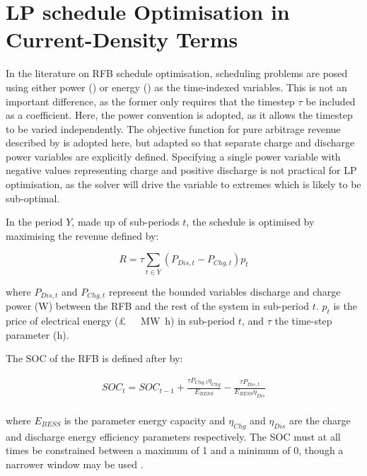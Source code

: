 \documentclass[preprint,3p,review,authoryear,10pt]{elsarticle}
\begin{document}
\section{LP schedule Optimisation in Current-Density Terms}
\label{Model_Formulation_LP_Reference_Current_Density_Terms}
In the literature on RFB schedule optimisation, scheduling problems are posed using either power (\cite{Chen2012,Hu2010,Nguyen2015}) or energy (\cite{Johnston2015,Vaca2017}) as the time-indexed variables. This is not an important difference, as the former only requires that the timestep $\tau$ be included as a coefficient. Here, the power convention is adopted, as it allows the timestep to be varied independently. The objective function for pure arbitrage revenue described by \cite{Hu2010} is adopted here, but adapted so that separate charge and discharge power variables are explicitly defined. Specifying a single power variable with negative values representing charge and positive discharge is not practical for LP optimisation, as the solver will drive the variable to extremes which is likely to be sub-optimal.

In the period $Y$, made up of sub-periods $t$, the schedule is optimised by maximising the revenue defined by:

\begin{equation}
\label{eqn:Lit_Review_LP_Obj_Func}
R = \tau \sum_{t \in Y} (P_{Dis,t} - P_{Chg,t}) p_t
\end{equation}

where $P_{Dis,t}$ and $P_{Chg,t}$ represent the bounded variables discharge and charge power (\si{\watt}) between the RFB and the rest of the system in sub-period $t$. $p_t$ is the price of electrical energy (\SI[sticky-per, bracket-unit-denominator = false]{}[\pounds]{\per\mega\watt\hour}) in sub-period $t$, and $\tau$ the time-step parameter  (\si{\hour}). 

The SOC of the RFB is defined after \cite{Gomes2017} by:

\begin{equation}
\label{eqn: Lit_Review_LP_SOC_Constraint_Example}
\begin{gathered}
SOC_t = SOC_{t-1} + \frac{\tau P_{Chg,t} \eta_{Chg}}{E_{BESS}} - \frac{\tau P_{Dis,t}}{E_{BESS}\eta_{Dis}} \\
\end{gathered}
\end{equation}

where $E_{BESS}$ is the parameter energy capacity and $\eta_{Chg}$ and $\eta_{Dis}$ are the charge and discharge energy efficiency parameters respectively. The SOC must at all times be constrained between a maximum of 1 and a minimum of 0, though a narrower window may be used \cite{Vaca2017}.
\end{document}
